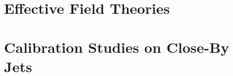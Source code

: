 \label{chapter:appendix}

\section{Effective Field Theories}

\section{Calibration Studies on Close-By Jets}